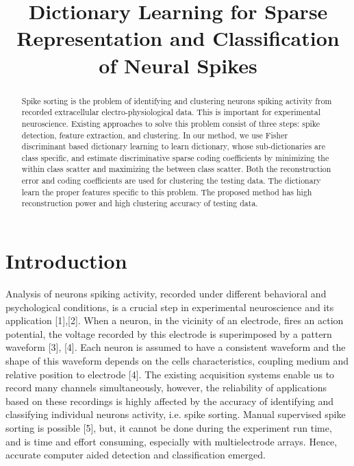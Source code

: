 \documentclass[conference]{IEEEtran}
\begin{document}
\title{Dictionary Learning for Sparse Representation and Classification of Neural Spikes}
\author{
}

\newcommand{\paralleled}[1]{\Vert{#1}\Vert}
\newcommand{\bigparalleled}[1]{\big\Vert{#1}\big\Vert}
\newcommand{\Bigparalleled}[1]{\Big\Vert{#1}\Big\Vert}
\newcommand{\biggparalleled}[1]{\bigg\Vert{#1}\bigg\Vert}
\newcommand{\Biggparalleled}[1]{\Bigg\Vert{#1}\Bigg\Vert}


\maketitle
	
	\begin{abstract}
		Spike sorting is the problem of identifying and
		clustering neurons spiking activity from recorded extracellular
		electro-physiological data. This is important for experimental
		neuroscience. Existing approaches to solve this problem consist of
		three steps: spike detection, feature extraction, and clustering. In
		our method, we use Fisher discriminant based dictionary learning
		to learn dictionary, whose sub-dictionaries are class specific, and
		estimate discriminative sparse coding coefficients by minimizing
		the within class scatter and maximizing the between class scatter.
		Both the reconstruction error and coding coefficients are used
		for clustering the testing data. The dictionary learn the proper
		features specific to this problem. The proposed method has high
		reconstruction power and high clustering accuracy of testing
		data.
	\end{abstract}
	
	\section{Introduction}
	Analysis of neurons spiking activity, recorded under different behavioral and psychological conditions, is a crucial step in experimental neuroscience and its application [1],[2]. When a neuron, in the vicinity of an electrode, fires an action potential, the voltage recorded by this electrode is superimposed by a pattern waveform [3], [4]. Each neuron is assumed to have a consistent waveform and the shape of this waveform depends on the cells characteristics, coupling medium and relative position to electrode [4]. The existing acquisition systems enable us to record many channels simultaneously, however, the reliability of applications based on these recordings is highly affected by the accuracy of identifying and classifying individual neurons activity, i.e. spike sorting. Manual supervised spike sorting is possible [5], but, it cannot be done during the experiment run time, and is time and effort consuming, especially with multielectrode arrays. Hence, accurate computer aided detection and classification emerged.
	
\end{document}

